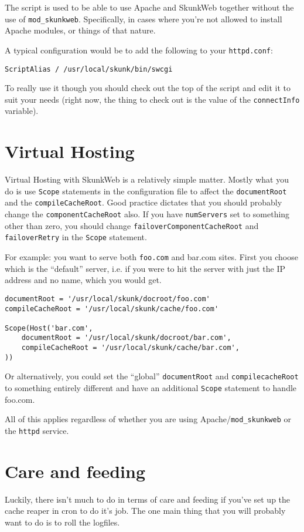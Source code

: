 \documentclass[titlepage]{manual}
\begin{document}
The  script is used to be able to use Apache and
SkunkWeb together without the use of \texttt{mod_skunkweb}.
Specifically, in cases where you're not allowed to install Apache
modules, or things of that nature.

A typical configuration would be to add the following to your
\texttt{httpd.conf}:
\begin{verbatim}
ScriptAlias / /usr/local/skunk/bin/swcgi
\end{verbatim}

To really use it though you should check out the top of the script and
edit it to suit your needs (right now, the thing to check out is the
value of the \texttt{connectInfo} variable).

\chapter{Virtual Hosting}
Virtual Hosting with SkunkWeb is a relatively simple matter.  Mostly
what you do is use \texttt{Scope} statements in the configuration file
to affect the \texttt{documentRoot} and the \texttt{compileCacheRoot}.
Good practice dictates that you should probably change the
\texttt{componentCacheRoot} also.  If you have \texttt{numServers} set
to something other than zero, you should change
\texttt{failoverComponentCacheRoot} and \texttt{failoverRetry} in the
\texttt{Scope} statement.

For example:  you want to serve both \texttt{foo.com} and {bar.com} sites.
First you choose which is the ``default'' server, i.e. if you were to hit
the server with just the IP address and no name, which you would get.

\begin{verbatim}
documentRoot = '/usr/local/skunk/docroot/foo.com'
compileCacheRoot = '/usr/local/skunk/cache/foo.com'

Scope(Host('bar.com',
    documentRoot = '/usr/local/skunk/docroot/bar.com',
    compileCacheRoot = '/usr/local/skunk/cache/bar.com',
))    
\end{verbatim}

Or alternatively, you could set the ``global'' \texttt{documentRoot}
and \texttt{compilecacheRoot} to something entirely different and have
an additional \texttt{Scope} statement to handle foo.com.

All of this applies regardless of whether you are using
Apache/\texttt{mod\_skunkweb} or the \texttt{httpd} service.

\chapter{Care and feeding}
Luckily, there isn't much to do in terms of care and feeding if you've
set up the cache reaper in cron to do it's job.  The one main thing
that you will probably want to do is to roll the logfiles.
\end{document}
